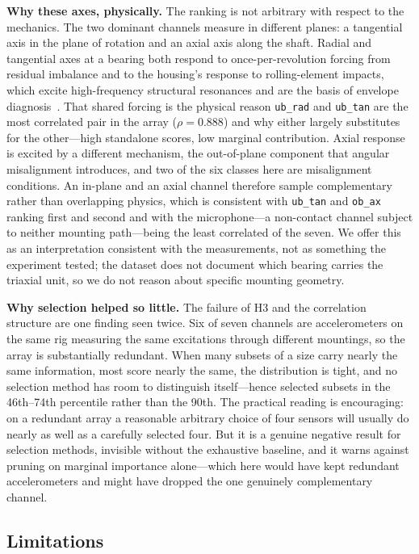 \documentclass[conference]{IEEEtran}
\begin{document}
\textbf{Why these axes, physically.} The ranking is not arbitrary with respect
to the mechanics. The two dominant channels measure in different planes: a
tangential axis in the plane of rotation and an axial axis along the shaft.
Radial and tangential axes at a bearing both respond to once-per-revolution
forcing from residual imbalance and to the housing's response to
rolling-element impacts, which excite high-frequency structural resonances and
are the basis of envelope diagnosis~\cite{randall2011}. That shared forcing is
the physical reason \texttt{ub\_rad} and \texttt{ub\_tan} are the most
correlated pair in the array ($\rho=0.888$) and why either largely substitutes
for the other---high standalone scores, low marginal contribution. Axial
response is excited by a different mechanism, the out-of-plane component that
angular misalignment introduces, and two of the six classes here are
misalignment conditions. An in-plane and an axial channel therefore sample
complementary rather than overlapping physics, which is consistent with
\texttt{ub\_tan} and \texttt{ob\_ax} ranking first and second and with the
microphone---a non-contact channel subject to neither mounting path---being the
least correlated of the seven. We offer this as an interpretation consistent
with the measurements, not as something the experiment tested; the dataset does
not document which bearing carries the triaxial unit, so we do not reason about
specific mounting geometry.

\textbf{Why selection helped so little.} The failure of H3 and the correlation
structure are one finding seen twice. Six of seven channels are accelerometers
on the same rig measuring the same excitations through different mountings, so
the array is substantially redundant. When many subsets of a size carry nearly
the same information, most score nearly the same, the distribution is tight,
and no selection method has room to distinguish itself---hence selected subsets
in the 46th--74th percentile rather than the 90th. The practical reading is
encouraging: on a redundant array a reasonable arbitrary choice of four sensors
will usually do nearly as well as a carefully selected four. But it is a
genuine negative result for selection methods, invisible without the exhaustive
baseline, and it warns against pruning on marginal importance alone---which
here would have kept redundant accelerometers and might have dropped the one
genuinely complementary channel.

\subsection{Limitations}
\label{sec:limitations}
\end{document}
